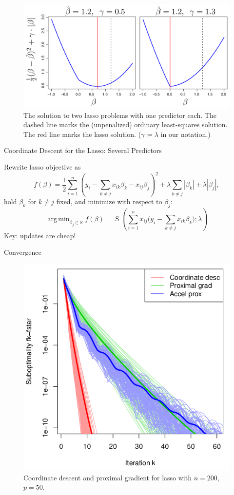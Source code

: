 \documentclass[10pt,ignorenonframetext]{beamer}
\DeclareMathOperator*{\argmin}{arg\,min}
\begin{document}
\begin{frame}

\begin{figure}
    \centering
    \includegraphics[width=0.85\linewidth]{figures/lasso-single-predictor.pdf}
    \caption{The solution to two lasso problems with one predictor each. The dashed line marks the (unpenalized) ordinary least-squares solution. The red line marks the lasso solution. (\(\gamma \coloneqq \lambda\) in our notation.)}
\end{figure}
    
\end{frame}

\begin{frame}{Coordinate Descent for the Lasso: Several Predictors}

Rewrite lasso objective as 
\[
f(\beta) = \frac 12 \sum_{i=1}^n\left(y_i - \sum_{k \neq j}x_{ik}\beta_k - x_{ij}\beta_j\right)^2 + \lambda \sum_{k \neq j}|\beta_k| + \lambda | \beta_j|,
\]
hold \(\beta_k\) for \(k \neq j\) fixed, and minimize with respect to \(\beta_j\):
\[
\argmin_{\beta_j \in \mathbb{R}} f(\beta) = \operatorname{S}\left( \sum_{i=1}^n x_{ij}\bigg(y_i - \sum_{k \neq j} x_{ik}\beta_k\bigg); \lambda\right)
\]
\medskip
\alert{Key}: updates are cheap!
    
\end{frame}

\begin{frame}{Convergence}

\begin{figure}
    \centering
    \includegraphics[width=0.6\linewidth]{figures/cd-convergence.png}
    \caption{Coordinate descent and proximal gradient for lasso with \(n = 200\), \(p=50\).}
\end{figure}
    
\end{frame}
\end{document}
